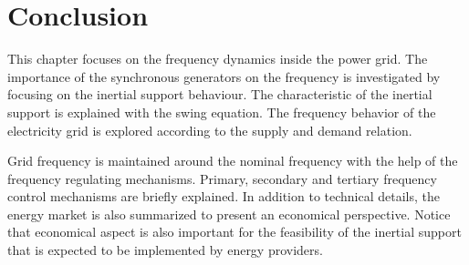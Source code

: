 \section{Conclusion}
This chapter focuses on the frequency dynamics inside the power grid. The importance of the synchronous generators on the frequency is investigated by focusing on the inertial support behaviour. The characteristic of the inertial support is explained with the swing equation. The frequency behavior of the electricity grid is explored according to the supply and demand relation. \par
Grid frequency is maintained around the nominal frequency with the help of the frequency regulating mechanisms. Primary, secondary and tertiary frequency control mechanisms are briefly explained. In addition to technical details, the energy market is also summarized to present an economical perspective. Notice that economical aspect is also important for the feasibility of the inertial support that is expected to be implemented by energy providers.
